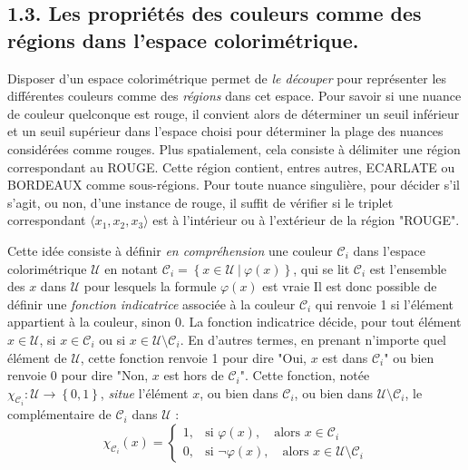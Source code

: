 \documentclass{article}
\begin{document}
\subsection*{1.3. 	Les propriétés des couleurs comme des régions dans l’espace colorimétrique.}
\par
Disposer d’un espace colorimétrique permet de \textit{le découper} pour représenter les différentes couleurs comme des \textit{régions} dans cet espace. Pour savoir si une nuance de couleur quelconque est rouge, il convient alors de déterminer un seuil inférieur et un seuil supérieur dans l’espace choisi pour déterminer la plage des nuances considérées comme rouges. Plus spatialement, cela consiste à délimiter une région correspondant au ROUGE. Cette région contient, entres autres, ECARLATE ou BORDEAUX comme sous-régions. Pour toute nuance singulière, pour décider s’il s’agit, ou non, d’une instance de rouge, il suffit de vérifier si le triplet correspondant $\langle x_1, x_2, x_3\rangle$ est à l’intérieur ou à l’extérieur de la région "ROUGE". 
\par
Cette idée consiste à définir \textit{en compréhension} une couleur $\mathcal{C}_i$ dans l’espace colorimétrique $\mathcal{U}$ en notant $\mathcal{C}_i=\left\{x\in\mathcal{U}\ |\ \varphi(x)\right\}$, qui se lit \og $\mathcal{C}_i$ est l’ensemble des $x$ dans $\mathcal{U}$ pour lesquels la formule $\varphi(x)$ est vraie \fg Il est donc possible de définir une \textit{fonction indicatrice} associée à la couleur $\mathcal{C}_i$ qui renvoie 1 si l'élément appartient à la couleur, sinon 0. La fonction indicatrice décide, pour tout élément $x\in\mathcal{U}$, si $x\in\mathcal{C}_i$ ou si $x\in\mathcal{U}\setminus\mathcal{C}_i$. En d’autres termes, en prenant n’importe quel élément de $\mathcal{U}$, cette fonction renvoie 1 pour dire "Oui, $x$ est dans $\mathcal{C}_i$" ou bien renvoie 0 pour dire "Non, $x$ est hors de $\mathcal{C}_i$". Cette fonction, notée $\chi_{\mathcal{C}_i} : \mathcal{U} \rightarrow \left\{0, 1\right\}$, \textit{situe} l’élément $x$, ou bien dans $\mathcal{C}_i$, ou bien dans $\mathcal{U} \setminus \mathcal{C}_i$, le complémentaire de $\mathcal{C}_i$ dans $\mathcal{U}$ :
\vspace{-0.5em}
\[
\chi_{\mathcal{C}_i}(x) =
\left\{
\begin{array}{ll}
1, & \text{si } \varphi(x), \quad \text{alors } x \in \mathcal{C}_i \\
0, & \text{si } \neg\varphi(x), \quad \text{alors } x \in \mathcal{U} \setminus \mathcal{C}_i
\end{array}
\right.
\]
\end{document}
